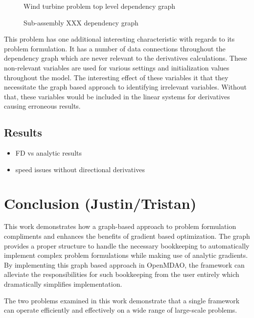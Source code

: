\documentclass[]{aiaa-tc} %
\begin{document}
    \begin{figure}[!htbp]
        \caption{Wind turbine problem top level dependency graph}
        \label{fig:wt_top_depgraph}
    \end{figure}

    \begin{figure}[!htbp]
        \caption{Sub-assembly XXX dependency graph}
        \label{fig:wt_sub_depgraph}
    \end{figure}
    

    This problem has one additional interesting characteristic with regards to its 
    problem formulation. It has a number of data connections throughout the dependency 
    graph which are never relevant to the derivatives calculations. These non-relevant 
    variables are used for various settings and initialization values throughout the
    model. The interesting effect of these variables it that they necessitate the 
    graph based approach to identifying irrelevant variables. Without that, these 
    variables would be included in the linear systems for derivatives causing erroneous 
    results. 


    \subsection{Results}
        \begin{itemize}
            \item FD vs analytic results
            \item speed issues without directional derivatives
        \end{itemize}


  \section{Conclusion (Justin/Tristan)}

      This work demonstrates how a graph-based approach to problem formulation compliments and enhances the benefits of gradient based
      optimization. The graph provides a proper structure to handle the necessary bookkeeping to automatically implement complex
      problem formulations while making use of analytic gradients. By implementing this graph based approach in OpenMDAO, the framework
      can alleviate the responsibilities for such bookkeeping from the user entirely which dramatically simplifies implementation.

      The two problems examined in this work demonstrate that a single framework can operate efficiently and effectively on a wide range of large-scale problems.

  
\end{document}
